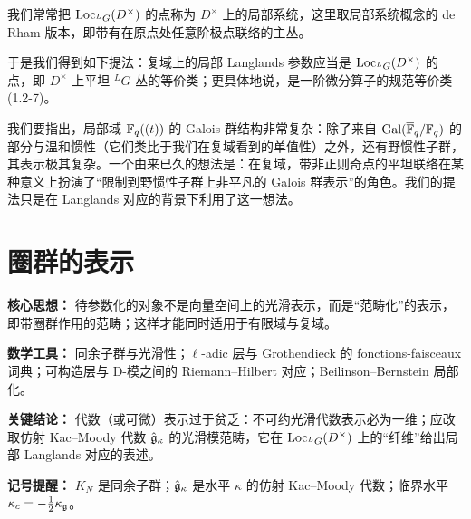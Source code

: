 我们常常把 $\operatorname{Loc}_{{}^L G}(D^\times)$ 的点称为 $D^\times$ 上的局部系统，这里取局部系统概念的 de Rham 版本，即带有在原点处任意阶极点联络的主丛。

于是我们得到如下提法：复域上的局部 Langlands 参数应当是 $\operatorname{Loc}_{{}^L G}(D^\times)$ 的点，即 $D^\times$ 上平坦 ${}^L G$-丛的等价类；更具体地说，是一阶微分算子的规范等价类 (1.2-7)。

我们要指出，局部域 $\mathbb{F}_q((t))$ 的 Galois 群结构非常复杂：除了来自 $\operatorname{Gal}(\overline{\mathbb{F}}_q/\mathbb{F}_q)$ 的部分与温和惯性（它们类比于我们在复域看到的单值性）之外，还有野惯性子群，其表示极其复杂。一个由来已久的想法是：在复域，带非正则奇点的平坦联络在某种意义上扮演了“限制到野惯性子群上非平凡的 Galois 群表示”的角色。我们的提法只是在 Langlands 对应的背景下利用了这一想法。

\section{圈群的表示}

\begin{keypoints}
    \item \textbf{核心思想：} 待参数化的对象不是向量空间上的光滑表示，而是“范畴化”的表示，即带圈群作用的范畴；这样才能同时适用于有限域与复域。
    \item \textbf{数学工具：} 同余子群与光滑性；$\ell$-adic 层与 Grothendieck 的 fonctions-faisceaux 词典；可构造层与 D-模之间的 Riemann--Hilbert 对应；Beilinson--Bernstein 局部化。
    \item \textbf{关键结论：} 代数（或可微）表示过于贫乏：不可约光滑代数表示必为一维；应改取仿射 Kac--Moody 代数 $\hat{\mathfrak{g}}_\kappa$ 的光滑模范畴，它在 $\operatorname{Loc}_{{}^L G}(D^\times)$ 上的“纤维”给出局部 Langlands 对应的表述。
    \item \textbf{记号提醒：} $K_N$ 是同余子群；$\hat{\mathfrak{g}}_\kappa$ 是水平 $\kappa$ 的仿射 Kac--Moody 代数；临界水平 $\kappa_c=-\frac{1}{2}\kappa_{\mathfrak{g}}$。
\end{keypoints}

